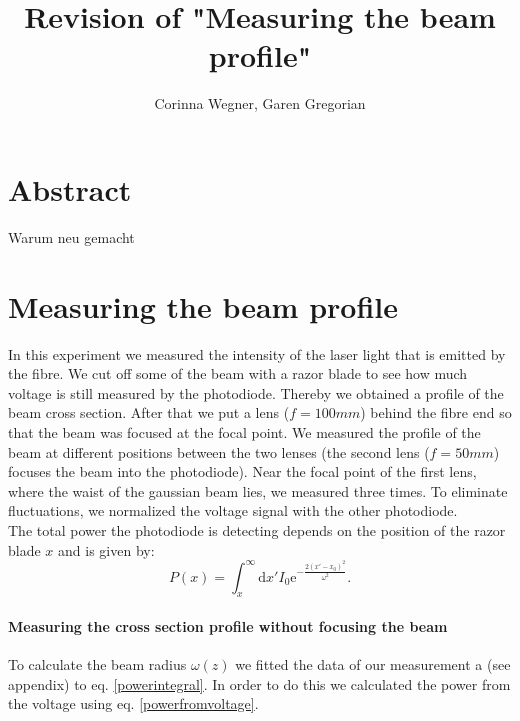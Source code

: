 \documentclass{article}
\title{Revision of "Measuring the beam profile"}
\author{Corinna Wegner, Garen Gregorian}
\begin{document}
\maketitle
\section{Abstract} 
Warum neu gemacht

\section{Measuring the beam profile}

In this experiment we measured the intensity of the laser light that is emitted by the fibre. We cut off some of the beam with a razor blade to see how much voltage is still measured by the photodiode. Thereby we obtained a profile of the beam cross section. After that we put a lens ($f=100mm$) behind the fibre end so that the beam was focused at the focal point. We measured the profile of the beam at different positions between the two lenses (the second lens ($f=50mm$) focuses the beam into the photodiode). Near the focal point of the first lens, where the waist of the gaussian beam lies, we measured three times. To eliminate fluctuations, we normalized the voltage signal with the other photodiode.\\

The total power the photodiode is detecting depends on the position of the razor blade $x$ and is given by:
\begin{equation}
P(x) = \int_x^\infty\mathrm{d}x' I_0 \mathrm{e}^{-\frac{2(x'-x_0)^2}{\omega^2}}.
\label{powerintegral}
\end{equation}


\paragraph{Measuring the cross section profile without focusing the beam}

To calculate the beam radius $\omega (z)$ we fitted the data of our measurement a (see appendix) to eq. \ref{powerintegral}. In order to do this we calculated the power from the voltage using eq. \ref{powerfromvoltage}. \\
\end{document}
